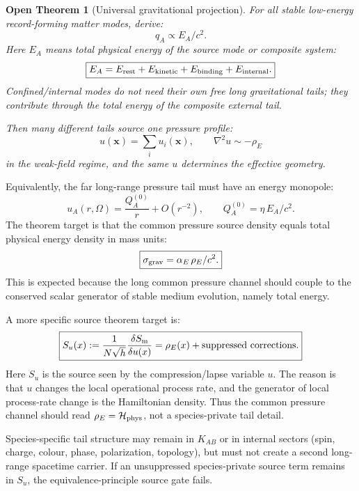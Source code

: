 \documentclass[11pt]{article}
\newtheorem{openthm}{Open Theorem}
\begin{document}
\begin{openthm}[Universal gravitational projection]
For all stable low-energy record-forming matter modes, derive:
\[
\boxed{
q_A\propto E_A/c^2.
}
\]
Here $E_A$ means total physical energy of the source mode or composite system:
\[
\boxed{
E_A
=
E_{\rm rest}
+E_{\rm kinetic}
+E_{\rm binding}
+E_{\rm internal}.
}
\]
Confined/internal modes do not need their own free long gravitational tails;
they contribute through the total energy of the composite external tail.

Then many different tails source one pressure profile:
\[
\boxed{
u(\mathbf x)=\sum_i u_i(\mathbf x),
\qquad
\nabla^2u\sim-\rho_E
}
\]
in the weak-field regime, and the same $u$ determines the effective geometry.
\end{openthm}

Equivalently, the far long-range pressure tail must have an energy monopole:
\[
\boxed{
u_A(r,\Omega)
=
\frac{Q_A^{(0)}}{r}
+O(r^{-2}),
\qquad
Q_A^{(0)}=\eta\,E_A/c^2.
}
\]
The theorem target is that the common pressure source density equals total
physical energy density in mass units:
\[
\boxed{
\sigma_{\rm grav}
=
\alpha_E\,\rho_E/c^2.
}
\]
This is expected because the long common pressure channel should couple to the
conserved scalar generator of stable medium evolution, namely total energy.

A more specific source theorem target is:
\[
\boxed{
S_u(x)
:=
\frac{1}{N\sqrt h}\frac{\delta S_{\rm m}}{\delta u(x)}
=
\rho_E(x)
+\hbox{suppressed corrections}.
}
\]
Here \(S_u\) is the source seen by the compression/lapse variable \(u\).
The reason is that \(u\) changes the local operational process rate, and the
generator of local process-rate change is the Hamiltonian density.  Thus the
common pressure channel should read \(\rho_E=\mathcal H_{\rm phys}\), not a
species-private tail detail.

Species-specific tail structure may remain in $K_{AB}$ or in internal sectors
(spin, charge, colour, phase, polarization, topology), but must not create a
second long-range spacetime carrier.  If an unsuppressed species-private
source term remains in $S_u$, the equivalence-principle source gate fails.
\end{document}
